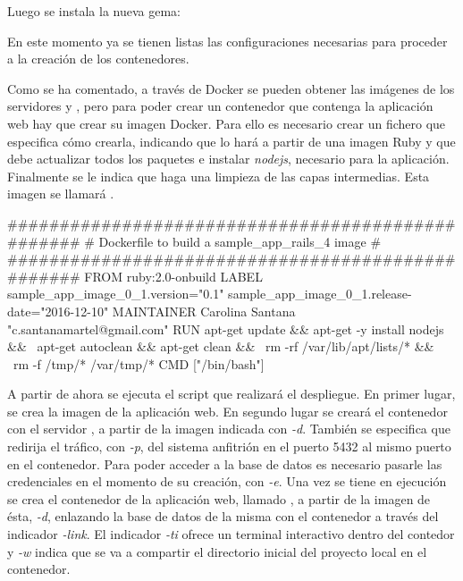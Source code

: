 Luego se instala la nueva gema: 


En este momento ya se tienen listas las configuraciones necesarias para proceder a la creación de los contenedores.

Como se ha comentado, a través de Docker se pueden obtener las imágenes de los servidores  y , pero para poder crear un contenedor que contenga la aplicación web hay que crear su imagen Docker. Para ello es necesario crear un fichero  que especifica cómo crearla, indicando que lo hará a partir de una imagen Ruby y que debe actualizar todos los paquetes e instalar \textit{nodejs}, necesario para la aplicación. Finalmente se le indica que haga una limpieza de las capas intermedias. Esta imagen se llamará . 

\begin{codelisting}
\label{code:dockerfile}
\begin{code}
##################################################
# Dockerfile to build a sample_app_rails_4 image #
##################################################
FROM ruby:2.0-onbuild
LABEL sample_app_image_0_1.version="0.1" sample_app_image_0_1.release-date="2016-12-10"
MAINTAINER Carolina Santana "c.santanamartel@gmail.com"
RUN apt-get update && apt-get -y install nodejs && \
    apt-get autoclean && apt-get clean && \
    rm -rf /var/lib/apt/lists/* && \
    rm -f /tmp/* /var/tmp/*
CMD ["/bin/bash"]
\end{code}
\end{codelisting}

A partir de ahora se ejecuta el script que realizará el despliegue. En primer lugar, se crea la imagen de la aplicación web. En segundo lugar se creará el contenedor  con el servidor , a partir de la imagen  indicada con \textit{\--d}. También se especifica que redirija el tráfico, con \textit{\--p}, del sistema anfitrión en el puerto 5432 al mismo puerto en el contenedor. Para poder acceder a la base de datos es necesario pasarle las credenciales en el momento de su creación, con \textit{\--e}. Una vez se tiene en ejecución se crea el contenedor de la aplicación web, llamado , a partir de la imagen de ésta, \textit{\--d}, enlazando la base de datos de la misma con el contenedor  a través del indicador \textit{\--link}. El indicador \textit{-ti} ofrece un terminal interactivo dentro del contedor y \textit{-w} indica que se va a compartir el directorio inicial del proyecto local en el contenedor. 


